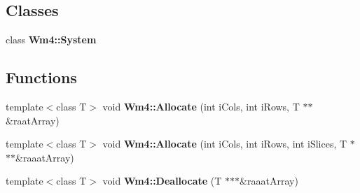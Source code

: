 \subsection*{Classes}
\begin{CompactItemize}
\item 
class {\bf Wm4::System}
\end{CompactItemize}
\subsection*{Functions}
\begin{CompactItemize}
\item 
template$<$class T$>$ void {\bf Wm4::Allocate} (int i\-Cols, int i\-Rows, T $\ast$$\ast$\&raat\-Array)
\item 
template$<$class T$>$ void {\bf Wm4::Allocate} (int i\-Cols, int i\-Rows, int i\-Slices, T $\ast$$\ast$$\ast$\&raaat\-Array)
\item 
template$<$class T$>$ void {\bf Wm4::Deallocate} (T $\ast$$\ast$$\ast$\&raaat\-Array)
\end{CompactItemize}
